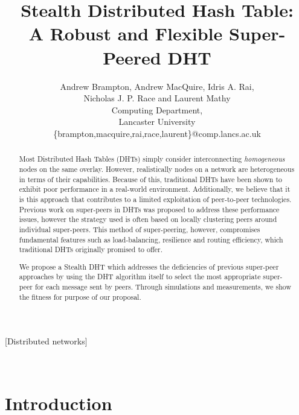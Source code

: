 \documentclass[letterpaper]{sig-alternate} %
\author{
Andrew Brampton, Andrew MacQuire, Idris A. Rai,\\
Nicholas J. P. Race and Laurent Mathy\\
Computing Department,\\
Lancaster University\\
\{brampton,macquire,rai,race,laurent\}@comp.lancs.ac.uk
}
\date{}
\begin{document}
\title{Stealth Distributed Hash Table:\\A Robust and Flexible Super-Peered DHT}
\maketitle

\begin{abstract}
Most Distributed Hash Tables (DHTs) simply consider interconnecting
{\em homogeneous} nodes on the same overlay. However, realistically
nodes on a network are heterogeneous in terms of their capabilities.
Because of this, traditional DHTs have been shown to exhibit poor
performance in a real-world environment. Additionally, we believe
that it is this approach that contributes to a limited exploitation
of peer-to-peer technologies. Previous work on super-peers in DHTs
was proposed to address these performance issues, however the
strategy used is often based on locally clustering peers around
individual super-peers. This method of super-peering, however,
compromises fundamental features such as load-balancing, resilience
and routing efficiency, which traditional DHTs originally promised
to offer.

We propose a Stealth DHT which addresses the deficiencies of
previous super-peer approaches by using the DHT algorithm itself to
select the most appropriate super-peer for each message sent by
peers. Through simulations and measurements, we show the fitness for
purpose of our proposal.
\end{abstract}

[Distributed networks]



~\\
\section{Introduction}
\label{sect-intro}
\end{document}
